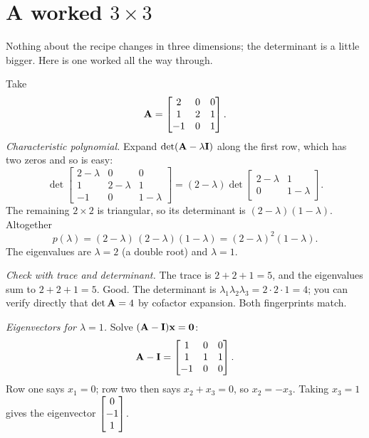 \section{A worked $3\times 3$}
\label{ch23:threebythree}

Nothing about the recipe changes in three dimensions; the determinant is a
little bigger. Here is one worked all the way through.

\begin{example}
\label{ch23:ex-3x3}
Take
\[
  \mathbf{A}=\begin{bmatrix}2 & 0 & 0\\ 1 & 2 & 1\\ -1 & 0 & 1\end{bmatrix}.
\]
\emph{Characteristic polynomial.} Expand $\det(\mathbf{A}-\lambda\mathbf{I})$ along the
first row, which has two zeros and so is easy:
\[
  \det\begin{bmatrix}2-\lambda & 0 & 0\\ 1 & 2-\lambda & 1\\ -1 & 0 & 1-\lambda\end{bmatrix}
  =(2-\lambda)\det\begin{bmatrix}2-\lambda & 1\\ 0 & 1-\lambda\end{bmatrix}.
\]
The remaining $2\times 2$ is triangular, so its determinant is
$(2-\lambda)(1-\lambda)$. Altogether
\[
  p(\lambda)=(2-\lambda)\,(2-\lambda)(1-\lambda)=(2-\lambda)^2(1-\lambda).
\]
The eigenvalues are $\lambda=2$ (a double root) and $\lambda=1$.

\emph{Check with trace and determinant.} The trace is $2+2+1=5$, and the
eigenvalues sum to $2+2+1=5$. Good. The determinant is
$\lambda_1\lambda_2\lambda_3=2\cdot2\cdot1=4$; you can verify directly that
$\det\mathbf{A}=4$ by cofactor expansion. Both fingerprints match.

\emph{Eigenvectors for $\lambda=1$.} Solve $(\mathbf{A}-\mathbf{I})\mathbf{x}=\mathbf{0}$:
\[
  \mathbf{A}-\mathbf{I}=\begin{bmatrix}1 & 0 & 0\\ 1 & 1 & 1\\ -1 & 0 & 0\end{bmatrix}.
\]
Row one says $x_1=0$; row two then says $x_2+x_3=0$, so $x_2=-x_3$. Taking
$x_3=1$ gives the eigenvector $\begin{bmatrix}0\\-1\\1\end{bmatrix}$.


\end{example}
